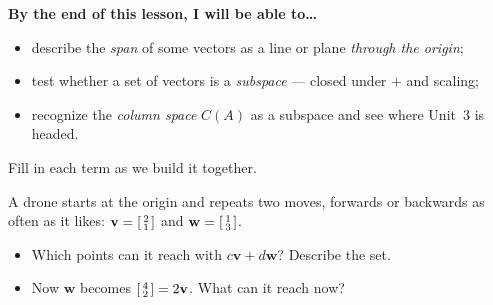 \documentclass[10pt]{article}
\newcommand{\vv}{\mathbf{v}}
\newcommand{\ww}{\mathbf{w}}
\begin{document}
\namedateperiod

\vspace{0.12in}

\begin{objectivebox}
\textbf{By the end of this lesson, I will be able to\dots}
\begin{itemize}\setlength{\itemsep}{2pt}
  \item describe the \emph{span} of some vectors as a line or plane \emph{through the origin};
  \item test whether a set of vectors is a \emph{subspace} --- closed under $+$ and scaling;
  \item recognize the \emph{column space} $C(A)$ as a subspace and see where Unit~3 is headed.
\end{itemize}
\end{objectivebox}

\vspace{0.10in}

\begin{vocabbox}
\small
Fill in each term as we build it together.
\vspace{2pt}
\end{vocabbox}

\begin{hookbox}
A drone starts at the origin and repeats two moves, forwards or backwards as often as it likes:
$\vv=\begin{bsmallmatrix} 2\\1 \end{bsmallmatrix}$ and $\ww=\begin{bsmallmatrix} 1\\3 \end{bsmallmatrix}$.
\begin{itemize}\setlength{\itemsep}{1pt}
  \item Which points can it reach with $c\vv+d\ww$? Describe the set. \writeline
  \item Now $\ww$ becomes $\begin{bsmallmatrix} 4\\2 \end{bsmallmatrix}=2\vv$. What can it reach now? \writeline
\end{itemize}
\end{hookbox}
\end{document}
